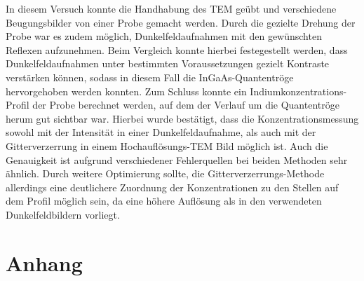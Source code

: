\documentclass[a4paper,11pt,DIV=11]{scrartcl}
\begin{document}
In diesem Versuch konnte die Handhabung des TEM geübt und verschiedene Beugungsbilder von einer Probe gemacht werden. Durch die gezielte Drehung der Probe war es zudem möglich, Dunkelfeldaufnahmen mit den gewünschten Reflexen aufzunehmen. Beim Vergleich konnte hierbei festegestellt werden, dass Dunkelfeldaufnahmen unter bestimmten Voraussetzungen gezielt Kontraste verstärken können, sodass in diesem Fall die InGaAs-Quantentröge hervorgehoben werden konnten.
Zum Schluss konnte ein Indiumkonzentrations-Profil der Probe berechnet werden, auf dem der Verlauf um die Quantentröge herum gut sichtbar war. Hierbei wurde bestätigt, dass die Konzentrationsmessung sowohl mit der Intensität in einer Dunkelfeldaufnahme, als auch mit der Gitterverzerrung in einem Hochauflösungs-TEM Bild möglich ist. Auch die Genauigkeit ist aufgrund verschiedener Fehlerquellen bei beiden Methoden sehr ähnlich. Durch weitere Optimierung sollte, die Gitterverzerrungs-Methode allerdings eine deutlichere Zuordnung der Konzentrationen zu den Stellen auf dem Profil möglich sein, da eine höhere Auflösung als in den verwendeten Dunkelfeldbildern vorliegt.

\newpage

\newpage

\newpage

\newpage

\section*{Anhang}
\end{document}
